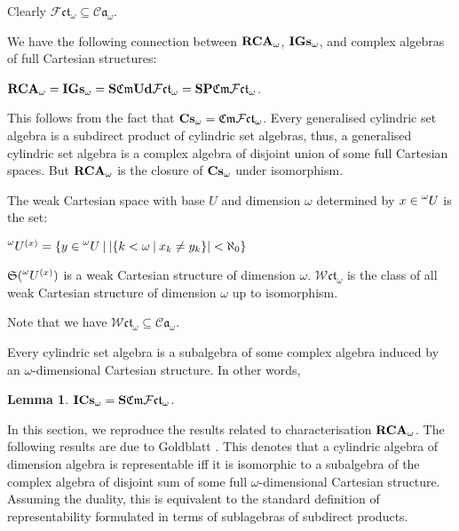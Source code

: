 \documentclass[a4paper]{article}
\theoremstyle{defin}
\theoremstyle{theorem}
\theoremstyle{claim}
\theoremstyle{prop}
\theoremstyle{lemma}
\newtheorem{lemma}{Lemma}
\theoremstyle{fact}
\theoremstyle{ex}
\theoremstyle{col}
\begin{document}
Clearly $\mathcal{F} \mathfrak{c}\mathfrak{t}_{\omega} \subseteq \mathcal{C}\mathfrak{a}_{\omega}$.

We have the following connection between ${\bf RCA}_{\omega}$, ${\bf IGs}_{\omega}$, and complex algebras of full Cartesian structures:
\begin{center}
${\bf RCA}_{\omega} = {\bf IGs}_{\omega} = {\bf S} \mathfrak{Cm} {\bf Ud} \mathcal{F} \mathfrak{c}\mathfrak{t}_{\omega} = {\bf S P} \mathfrak{Cm}  \mathcal{F} \mathfrak{c}\mathfrak{t}_{\omega}$.
\end{center}
This follows from the fact that ${\bf Cs}_{\omega} = \mathfrak{Cm} \mathcal{F} \mathfrak{c}\mathfrak{t}_{\omega}$. Every generalised cylindric set algebra is a subdirect product of cylindric set algebras, thus, a generalised cylindric set algebra is a complex algebra of disjoint union of some full Cartesian spaces. But ${\bf RCA}_{\omega}$ is the closure of ${\bf Cs}_{\omega}$ under isomorphism.

\begin{defin}
The weak Cartesian space with base $U$ and dimension $\omega$ determined by $x \in \prescript{\omega}{}U$ is the set:
\begin{center}
$\prescript{\omega}{}U^{(x)} = \{ y \in \prescript{\omega}{}U \: | \: |\{ k < \omega \: | \: x_k \neq y_k \}| < \aleph_0 \}$
\end{center}
$\mathfrak{S}(\prescript{\omega}{}U^{(x)})$ is a weak Cartesian structure of dimension $\omega$. $\mathcal{W} \mathfrak{ct}_{\omega}$ is the class of all weak Cartesian structure of dimension $\omega$ up to isomorphism.
\end{defin}
Note that we have $\mathcal{W} \mathfrak{ct}_{\omega} \subseteq \mathcal{C}\mathfrak{a}_{\omega}$.

Every cylindric set algebra is a subalgebra of some complex algebra induced by an $\omega$-dimensional Cartesian structure. In other words,

\begin{lemma}
${\bf I}{\bf Cs}_{\omega} = {\bf S} \mathfrak{Cm} \mathcal{F} \mathfrak{c}\mathfrak{t}_{\omega}$.
\end{lemma}


In this section, we reproduce the results related to characterisation ${\bf RCA}_{\omega}$. The following results are due to Goldblatt \cite{goldblatt1995elementary}. This denotes that a cylindric algebra of dimension algebra is representable iff it is isomorphic to a subalgebra of the complex algebra of disjoint sum of some full $\omega$-dimensional Cartesian structure. Assuming the duality, this is equivalent to the standard definition of representability formulated in terms of sublagebras of subdirect products.
\end{document}
